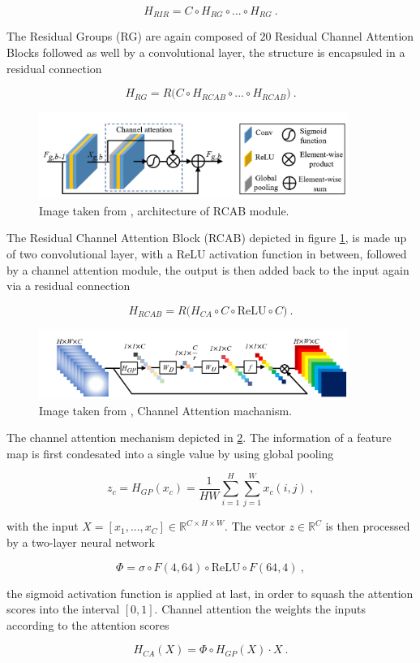     $$ H_{RIR} = C \circ H_{RG} \circ ... \circ H_{RG} ~.$$

The Residual Groups (RG) are again composed of $20$ Residual Channel Attention Blocks followed as well by a convolutional layer,
the structure is encapsuled in a residual connection

    $$ H_{RG} = R \big ( C \circ H_{RCAB} \circ ... \circ H_{RCAB} \big) ~.$$

\begin{figure}[h!]
    \includegraphics[width=0.9\textwidth]{models/sisr/imgs/drcan_rcab.png}
    \caption{Image taken from \cite{zhangImageSuperResolutionUsing2018}, architecture of RCAB module.}
    \label{fig:drcan_rcab}
\end{figure}

The Residual Channel Attention Block (RCAB) depicted in figure \ref{fig:drcan_rcab}, 
is made up of two convolutional layer, 
with a ReLU activation function in between, 
followed by a channel attention module,
the output is then added back to the input again via a residual connection

    $$H_{RCAB} = R \big( H_{CA} \circ C \circ \text{ReLU} \circ C \big) ~. $$

\begin{figure}[h!]
    \includegraphics[width=0.9\textwidth]{models/sisr/imgs/channel_attention.png}
    \caption{Image taken from \cite{zhangImageSuperResolutionUsing2018}, Channel Attention machanism.}
    \label{fig:channel_attention}
\end{figure}

The channel attention mechanism depicted in \ref{fig:channel_attention}.
The information of a feature map is first condesated into a single value by using global pooling

    $$z_c = H_{GP}(x_{c}) = \frac{1}{HW} \sum_{i=1}^H \sum_{j=1}^W x_{c}(i, j) ~, $$

with the input $X = [x_1, ..., x_C] \in \mathbb R^{C \times H \times W}$.
The vector $z \in \mathbb R^{C}$ is then processed by a two-layer neural network

    $$\Phi = \sigma \circ F(4, 64) \circ \text{ReLU} \circ F(64, 4) ~, $$

the sigmoid activation function is applied at last, 
in order to squash the attention scores into the interval $[0, 1]$.
Channel attention the weights the inputs according to the attention scores

    $$H_{CA}(X) = \Phi \circ H_{GP} (X) \cdot X ~.$$

